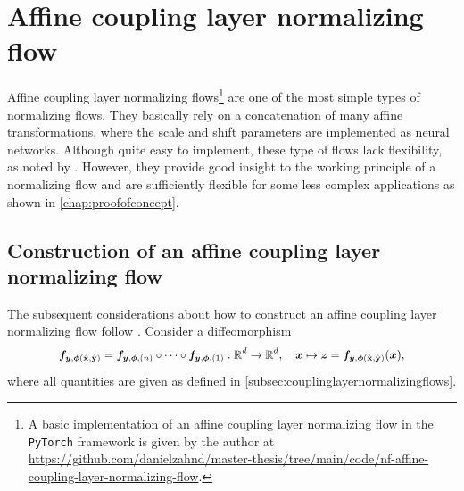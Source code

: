 \documentclass[a4paper,11pt]{report}
\begin{document}
\section{Affine coupling layer normalizing flow}\label{subsec:normflowsaffinecouplinglayers}
Affine coupling layer normalizing flows\cprotect\footnote{A basic implementation of an affine coupling layer normalizing flow in the \verb|PyTorch| framework is given by the author at \url{https://github.com/danielzahnd/master-thesis/tree/main/code/nf-affine-coupling-layer-normalizing-flow}.\label{footnote:NF_code}} are one of the most simple types of normalizing flows. They basically rely on a concatenation of many affine transformations, where the scale and shift parameters are implemented as neural networks. Although quite easy to implement, these type of flows lack flexibility, as noted by \cite[p.3]{Durkan.10.06.2019}. However, they provide good insight to the working principle of a normalizing flow and are sufficiently flexible for some less complex applications as shown in \cref{chap:proofofconcept}.
 
\subsection{Construction of an affine coupling layer normalizing flow}
The subsequent considerations about how to construct an affine coupling layer normalizing flow follow \cite[p.3-5]{Dinh.27.05.2016}. Consider a diffeomorphism \begin{align}\small \begin{aligned}
\bm{f}_{\bm{y},\bm{\phi}(\hat{\boldsymbol{\mathbf{x}}},\hat{\boldsymbol{\mathbf{y}}})} = \bm{f}_{\bm{y},\bm{\phi},(n)}\circ \dots \circ \bm{f}_{\bm{y},\bm{\phi},(1)}: \mathbb{R}^d \rightarrow \mathbb{R}^d, \quad \bm{x} \mapsto \bm{z} = \bm{f}_{\bm{y},\bm{\phi}(\hat{\boldsymbol{\mathbf{x}}},\hat{\boldsymbol{\mathbf{y}}})}(\bm{x}),
\end{aligned}\end{align} where all quantities are given as defined in \cref{subsec:couplinglayernormalizingflows}. 
\end{document}
